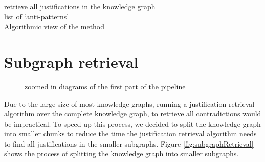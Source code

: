\documentclass[11pt,letterpaper ,oneside ]{book}
\begin{document}
\begin{algorithm}[H]
	
	retrieve all justifications in the knowledge graph\\
\Return list of `anti-patterns'\\
	\caption{Algorithmic view of the method}
\end{algorithm}

\section{Subgraph retrieval}
\begin{figure}[!t]
	\hfill
	\caption{zoomed in diagrams of the first part of the pipeline}
	\label{fig:PipelinePart12}
\end{figure}
Due to the large size of most knowledge graphs, running a justification retrieval algorithm over the complete knowledge graph, to retrieve all contradictions would be impractical. To speed up this process, we decided to split the knowledge graph into smaller chunks to reduce the time the justification retrieval algorithm needs to find all justifications in the smaller subgraphs. Figure \ref{fig:subgraphRetrieval} shows the process of splitting the knowledge graph into smaller subgraphs.
\end{document}
